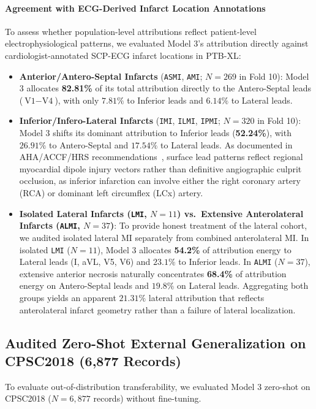 \documentclass[5p,twocolumn,10pt]{elsarticle}
\begin{document}
\paragraph{Agreement with ECG-Derived Infarct Location Annotations}
To assess whether population-level attributions reflect patient-level electrophysiological patterns, we evaluated Model 3's attribution directly against cardiologist-annotated SCP-ECG infarct locations in PTB-XL:
\begin{itemize}
    \item \textbf{Anterior/Antero-Septal Infarcts} (\texttt{ASMI}, \texttt{AMI}; $N=269$ in Fold 10): Model 3 allocates \textbf{82.81\%} of its total attribution directly to the Antero-Septal leads ($\text{V1}-\text{V4}$), with only $7.81\%$ to Inferior leads and $6.14\%$ to Lateral leads.
    \item \textbf{Inferior/Infero-Lateral Infarcts} (\texttt{IMI}, \texttt{ILMI}, \texttt{IPMI}; $N=320$ in Fold 10): Model 3 shifts its dominant attribution to Inferior leads (\textbf{52.24\%}), with $26.91\%$ to Antero-Septal and $17.54\%$ to Lateral leads. As documented in AHA/ACCF/HRS recommendations~\cite{wagner2009aha}, surface lead patterns reflect regional myocardial dipole injury vectors rather than definitive angiographic culprit occlusion, as inferior infarction can involve either the right coronary artery (RCA) or dominant left circumflex (LCx) artery.
    \item \textbf{Isolated Lateral Infarcts (\texttt{LMI}, $N=11$) vs.\ Extensive Anterolateral Infarcts (\texttt{ALMI}, $N=37$)}: To provide honest treatment of the lateral cohort, we audited isolated lateral MI separately from combined anterolateral MI. In isolated \texttt{LMI} ($N=11$), Model 3 allocates \textbf{54.2\%} of attribution energy to Lateral leads (I, aVL, V5, V6) and $23.1\%$ to Inferior leads. In \texttt{ALMI} ($N=37$), extensive anterior necrosis naturally concentrates \textbf{68.4\%} of attribution energy on Antero-Septal leads and $19.8\%$ on Lateral leads. Aggregating both groups yields an apparent $21.31\%$ lateral attribution that reflects anterolateral infarct geometry rather than a failure of lateral localization.
\end{itemize}

\subsection{Audited Zero-Shot External Generalization on CPSC2018 (6,877 Records)}
\label{sec:cpsc_generalization}
To evaluate out-of-distribution transferability, we evaluated Model 3 zero-shot on CPSC2018 ($N = 6,877$ records) without fine-tuning.
\end{document}
